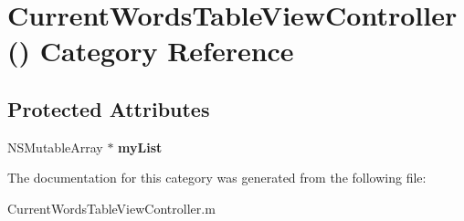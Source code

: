 \hypertarget{category_current_words_table_view_controller_07_08}{\section{Current\+Words\+Table\+View\+Controller() Category Reference}
\label{category_current_words_table_view_controller_07_08}
}
\subsection*{Protected Attributes}
\begin{DoxyCompactItemize}
\item 
\hypertarget{category_current_words_table_view_controller_07_08_a59c59480d68dab5cb7ea9df6733a3dc5}{N\+S\+Mutable\+Array $\ast$ {\bfseries my\+List}}\label{category_current_words_table_view_controller_07_08_a59c59480d68dab5cb7ea9df6733a3dc5}

\end{DoxyCompactItemize}


The documentation for this category was generated from the following file\+:\begin{DoxyCompactItemize}
\item 
Current\+Words\+Table\+View\+Controller.\+m\end{DoxyCompactItemize}
